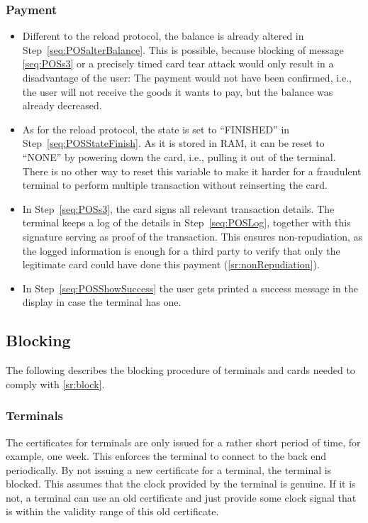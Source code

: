 \documentclass{article}
\begin{document}
\subsubsection*{Payment}
    \begin{itemize}

    \item Different to the reload protocol, the balance is already altered in Step~\ref{seq:POSalterBalance}.
    This is possible, because blocking of message \ref{seq:POSs3} or a precisely timed card tear attack would only result in a disadvantage of the user:
    The payment would not have been confirmed, i.e., the user will not receive the goods it wants to pay, but the balance was already decreased.

    \item As for the reload protocol, the state is set to ``FINISHED'' in Step~\ref{seq:POSStateFinish}.
    As it is stored in RAM, it can be reset to ``NONE'' by powering down the card, i.e., pulling it out of the terminal.
    There is no other way to reset this variable to make it harder for a fraudulent terminal to perform multiple transaction without reinserting the card.


    \item In Step~\ref{seq:POSs3}, the card signs all relevant transaction details.
    The terminal keeps a log of the details in Step~\ref{seq:POSLog}, together with this signature serving as proof of the transaction.
    This ensures non-repudiation, as the logged information is enough for a third party to verify that only the legitimate card could have done this payment (\ref{sr:nonRepudiation}).

    \item In Step~\ref{seq:POSShowSuccess} the user gets printed a success message in the display in case the terminal has one.
\end{itemize}


\subsection{Blocking} \label{sec:blocking}
The following describes the blocking procedure of terminals and cards needed to comply with \ref{sr:block}.

\subsubsection{Terminals} \label{sec:blockTerminal}
The certificates for terminals are only issued for a rather short period of time, for example, one week.
This enforces the terminal to connect to the back end periodically.
By not issuing a new certificate for a terminal, the terminal is blocked.
This assumes that the clock provided by the terminal is genuine.
If it is not, a terminal can use an old certificate and just provide some clock signal that is within the validity range of this old certificate.
\end{document}
